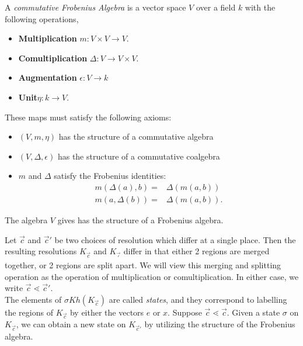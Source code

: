 \begin{definition}
A \emph{commutative Frobenius Algebra} is a vector space $V$ over a field $k$ with the following operations,
\begin{itemize}
\item \textbf{Multiplication} $m:V\times V\to V$.
\item \textbf{Comultiplication} $\Delta: V\to V\times V$. 
\item \textbf{Augmentation} $\epsilon: V\to k$
\item \textbf{Unit}$\eta: k\to V$. 
\end{itemize}
These maps must satisfy the following axioms:
\begin{itemize}
\item $(V, m, \eta)$ has the structure of a commutative algebra 
\item $(V, \Delta, \epsilon)$ has the structure of a commutative  coalgebra
\item $m$ and $\Delta$ satisfy the Frobenius identities:
\begin{align*}
m(\Delta(a), b)=&\Delta(m(a, b))\\
m(a, \Delta(b))=&\Delta(m(a, b)).
\end{align*}
\end{itemize}
\end{definition}
\begin{claim}
The algebra $V$ gives has the structure of a Frobenius algebra. 
\end{claim}
Let $\vec c$ and $\vec c'$ be two choices of resolution which differ at a single place. Then the resulting resolutions $K_{\vec c}$ and $K_{\vec '}$ differ in that either 2 regions are merged together, or 2 regions are split apart. We will view this merging and splitting operation as the operation of multiplication or comultiplication. In either case, we write $\vec c \lessdot \vec c'$.  \\
The elements of $\sigma Kh(K_{\vec c})$ are called \emph{states}, and they correspond to labelling the regions of $K_{\vec c}$ by either the vectors $e$ or $x$. Suppose $\vec c\lessdot \vec c$. Given a state $\sigma$ on $K_{\vec c}$, we can obtain a new state on $K_{\vec c'}$ by utilizing the structure of the Frobenius algebra. 
